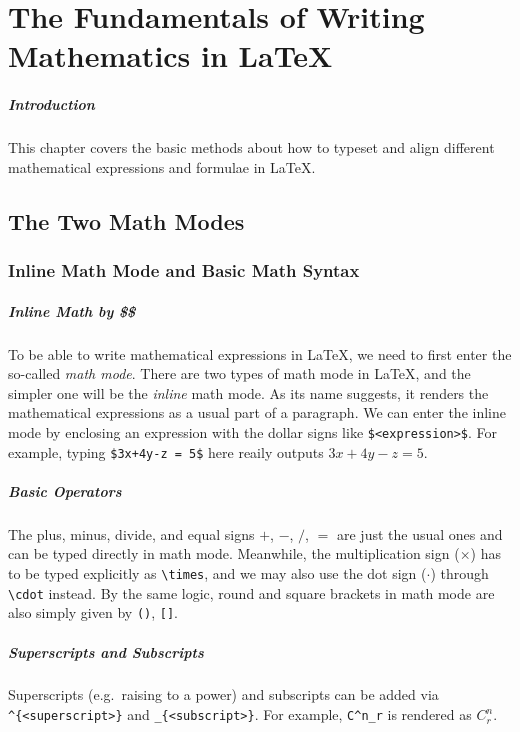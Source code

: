 \chapter{The Fundamentals of Writing Mathematics in \LaTeX{}}
\label{chap:maths}

\paragraph{Introduction}
This chapter covers the basic methods about how to typeset and align different mathematical expressions and formulae in \LaTeX{}.

\section{The Two Math Modes}

\subsection{Inline Math Mode and Basic Math Syntax}

\paragraph{Inline Math by \$\$}
To be able to write mathematical expressions in \LaTeX{}, we need to first enter the so-called \textit{math mode}. There are two types of math mode in \LaTeX{}, and the simpler one will be the \textit{inline} math mode. As its name suggests, it renders the mathematical expressions as a usual part of a paragraph. We can enter the inline mode by enclosing an expression with the dollar signs like \texttt{\$<expression>\$}. For example, typing \texttt{\$3x+4y-z = 5\$} here reaily outputs $3x+4y-z = 5$.

\paragraph{Basic Operators}
The plus, minus, divide, and equal signs $+$, $-$, $/$, $=$ are just the usual ones and can be typed directly in math mode. Meanwhile, the multiplication sign ($\times$) has to be typed explicitly as \texttt{\textbackslash times}, and we may also use the dot sign ($\cdot$) through \texttt{\textbackslash cdot} instead. By the same logic, round and square brackets in math mode are also simply given by \texttt{()}, \texttt{[]}.

\paragraph{Superscripts and Subscripts}
Superscripts (e.g.\ raising to a power) and subscripts can be added via \texttt{\^{}\{<superscript>\}} and \texttt{\_\{<subscript>\}}. For example, \verb|C^n_r| is rendered as $C^n_r$.

